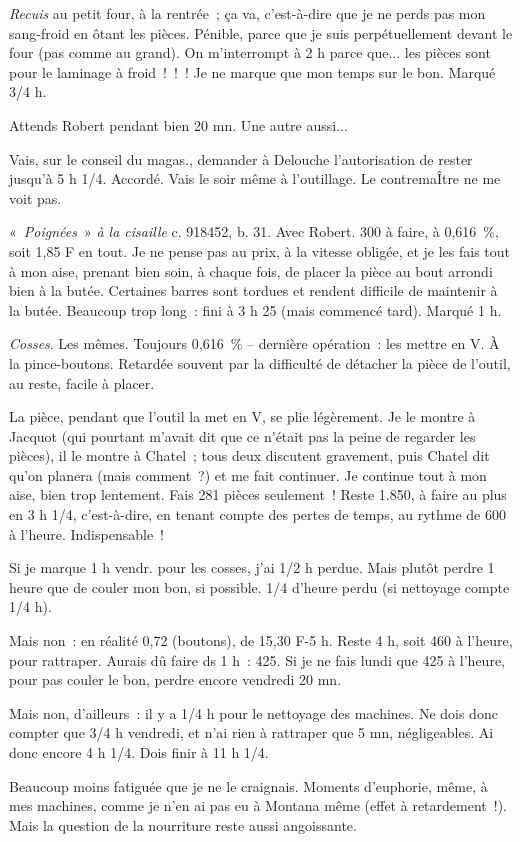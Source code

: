\documentclass[french,twoside]{book} %
\begin{document}
{\itshape Recuis} au petit four, à la rentrée ; ça va, c'est-à-dire que je ne perds pas mon sang-froid en ôtant les pièces. Pénible, parce que je suis perpétuellement devant le four (pas comme au grand). On m'interrompt à 2 h parce que... les pièces sont pour le laminage à froid ! ! ! Je ne marque que mon temps sur le bon. Marqué 3/4 h.\par
Attends Robert pendant bien 20 mn. Une autre aussi...\par
Vais, sur le conseil du magas., demander à Delouche l'autorisation de rester jusqu'à 5 h 1/4. Accordé. Vais le soir même à l'outillage. Le contremaÎtre ne me voit pas.\par
« {\itshape Poignées} » {\itshape à la cisaille} c. 918452, b. 31. Avec Robert. 300 à faire, à 0,616 \%, soit 1,85 F en tout. Je ne pense pas au prix, à la vitesse obligée, et je les fais tout à mon aise, prenant bien soin, à chaque fois, de placer la pièce au bout arrondi bien à la butée. Certaines barres sont tordues et rendent difficile de maintenir à la butée. Beaucoup trop long : fini à 3 h 25 (mais commencé tard). Marqué 1 h.\par
{\itshape Cosses}. Les mêmes. Toujours 0,616 \% – dernière opération : les mettre en V. À la pince-boutons. Retardée souvent par la difficulté de détacher la pièce de l'outil, au reste, facile à placer.\par
La pièce, pendant que l'outil la met en V, se plie légèrement. Je le montre à Jacquot (qui pourtant m'avait dit que ce n'était pas la peine de regarder les pièces), il le montre à Chatel ; tous deux discutent gravement, puis Chatel dit qu'on planera (mais comment ?) et me fait continuer. Je continue tout à mon aise, bien trop lentement. Fais 281 pièces seulement ! Reste 1.850, à faire au plus en 3 h 1/4, c'est-à-dire, en tenant compte des pertes de temps, au rythme de 600 à l'heure. Indispensable !\par
\par
Si je marque 1 h vendr. pour les cosses, j'ai 1/2 h perdue. Mais plutôt perdre 1 heure que de couler mon bon, si possible. 1/4 d'heure perdu (si nettoyage compte 1/4 h).\par
Mais non : en réalité 0,72 (boutons), de 15,30 F-5 h. Reste 4 h, soit 460 à l'heure, pour rattraper. Aurais dû faire ds 1 h : 425. Si je ne fais lundi que 425 à l'heure, pour pas couler le bon, perdre encore vendredi 20 mn.\par
Mais non, d'ailleurs : il y a 1/4 h pour le nettoyage des machines. Ne dois donc compter que 3/4 h vendredi, et n'ai rien à rattraper que 5 mn, négligeables. Ai donc encore 4 h 1/4. Dois finir à 11 h 1/4.\par
Beaucoup moins fatiguée que je ne le craignais. Moments d'euphorie, même, à mes machines, comme je n'en ai pas eu à Montana même (effet à retardement !). Mais la question de la nourriture reste aussi angoissante.
\end{document}
